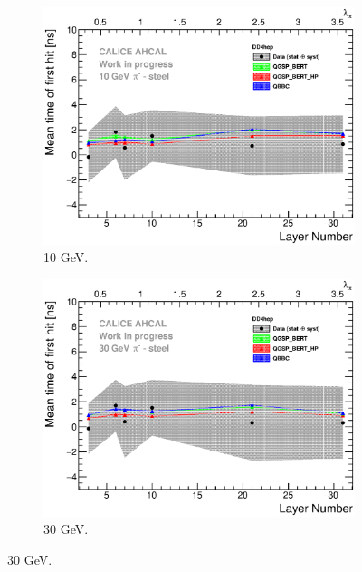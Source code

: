 \begin{figure}[htbp!]
  \begin{subfigure}[t]{0.49\textwidth}
    \centering
    \includegraphics[width=1\textwidth]{../Thesis_Plots/Timing/Pions/Plots/ComparisonToSim/Time_Depth_10GeV_DD4hep.eps}
    \caption{10 GeV.}\label{fig:Depth_SimData_10GeV_DD4hep}
  \end{subfigure}
  \hfill
  \begin{subfigure}[t]{0.49\textwidth}
    \centering
    \includegraphics[width=1\textwidth]{../Thesis_Plots/Timing/Pions/Plots/ComparisonToSim/Time_Depth_30GeV_DD4hep.eps}
    \caption{30 GeV.} \label{fig:Depth_SimData_30GeV_DD4hep}
  \end{subfigure}

\end{figure}
